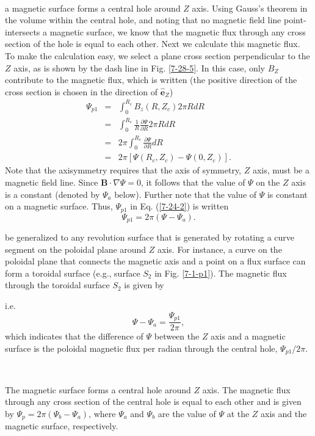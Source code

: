 \documentclass{article}
\begin{document}
\

a magnetic surface forms a central hole around $Z$ axis. Using Gauss's
theorem in the volume within the central hole, and noting that no magnetic
field line point-intersects a magnetic surface, we know that the magnetic flux
through any cross section of the hole is equal to each other. Next we
calculate this magnetic flux. To make the calculation easy, we select a plane
cross section perpendicular to the $Z$ axis, as is shown by the dash line in
Fig. \ref{7-28-5}. In this case, only $B_Z$ contribute to the magnetic flux,
which is written (the positive direction of the cross section is chosen in the
direction of $\hat{\mathbf{e}}_Z$)
\begin{eqnarray*}
  \Psi_{p 1} & = & \int_0^{R_c} B_z (R, Z_c) 2 \pi R d R\\
  & = & \int_0^{R_c} \frac{1}{R}  \frac{\partial \Psi}{\partial R} 2 \pi R d
  R\\
  & = & 2 \pi \int_0^{R_c} \frac{\partial \Psi}{\partial R} d R\\
  & = & 2 \pi [\Psi (R_c, Z_c) - \Psi (0, Z_c)] .
\end{eqnarray*}
Note that the axisymmetry requires that the axis of symmetry, $Z$ axis, must
be a magnetic field line. Since $\mathbf{B} \cdot \nabla \Psi = 0$, it follows
that the value of $\Psi$ on the $Z$ axis is a constant (denoted by $\Psi_a$
below). Further note that the value of $\Psi$ is constant on a magnetic
surface. Thus, $\Psi_{p 1}$ in Eq. (\ref{7-24-2}) is written
\begin{equation}
  \label{12-30-1} \Psi_{p 1} = 2 \pi (\Psi - \Psi_a) .
\end{equation}


be generalized to any revolution surface that is generated by rotating a curve
segment on the poloidal plane around $Z$ axis. For instance, a curve on the
poloidal plane that connects the magnetic axis and a point on a flux surface
can form a toroidal surface (e.g., surface $S_2$ in Fig. \ref{7-1-p1}). The
magnetic flux through the toroidal surface $S_2$ is given by

i.e.
\begin{equation}
  \Psi - \Psi_a = \frac{\Psi_{p 1}}{2 \pi},
\end{equation}
which indicates that the difference of $\Psi$ between the $Z$ axis and a
magnetic surface is the poloidal magnetic flux per radian through the central
hole, $\Psi_{p 1} / 2 \pi$.

\

The magnetic surface forms a central hole around $Z$ axis. The magnetic flux
through any cross section of the central hole is equal to each other and is
given by $\Psi_p = 2 \pi (\Psi_b - \Psi_a)$, where $\Psi_a$ and $\Psi_b$ are
the value of $\Psi$ at the $Z$ axis and the magnetic surface, respectively.
\end{document}
